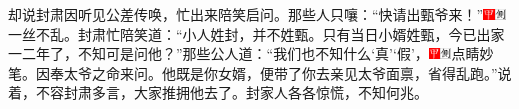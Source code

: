 却说封肃因听见公差传唤，忙出来陪笑启问。那些人只嚷：``快请出甄爷来！''{\includegraphics[width=3mm]{../Images/00002}\includegraphics[width=3mm]{../Images/00011}\footnotesize \kaishu 一丝不乱。}封肃忙陪笑道：``小人姓封，并不姓甄。只有当日小婿姓甄，今已出家一二年了，不知可是问他？''那些公人道：``我们也不知什么`真'`假'，{\includegraphics[width=3mm]{../Images/00002}\includegraphics[width=3mm]{../Images/00011}\footnotesize \kaishu 点睛妙笔。}因奉太爷之命来问。他既是你女婿，便带了你去亲见太爷面禀，省得乱跑。''说着，不容封肃多言，大家推拥他去了。封家人各各惊慌，不知何兆。

